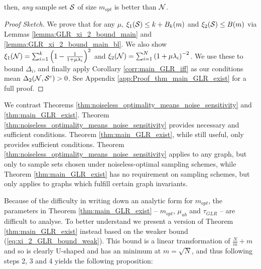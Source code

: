 {{\begin{theorem}
{    \noindent then,  \emph{any} sample set $\mathcal{S}$ of size $m_{opt}$ is better than $\mathcal{N}$.}
\end{theorem}
\begin{proof}[Proof Sketch] 
We prove that for any $\mu$, $\xi_{1}(\mathcal{S}) \leq k + B_{k}(m)$ and $\xi_{2}(\mathcal{S}) \leq B(m)$ via Lemmas \ref{lemma:GLR_xi_2_bound_main} and \ref{lemma:GLR_xi_2_bound_main_bl}. We also show $\xi_{1}(\mathcal{N}) = \sum_{i=1}^{k} \left(1 - \frac{1}{1+\mu\lambda_{i}}\right)^{2}$ and $\xi_{2}(\mathcal{N}) = \sum_{i=1}^{N} \left({1+\mu\lambda_{i}}\right)^{-2}$.
We use these to bound $\Delta_{i}$, and finally apply Corollary \ref{corr:main_GLR_iff} as our conditions mean $\Delta_{2}(\mathcal{N},\mathcal{S}^{c}) > 0$.  See Appendix \ref{app:Proof_thm_main_GLR_exist} for a full proof.
\end{proof}
}
 We contrast Theorems \ref{thm:noiseless_optimality_means_noise_sensitivity} and \ref{thm:main_GLR_exist}. Theorem \ref{thm:noiseless_optimality_means_noise_sensitivity} provides necessary and sufficient conditions. Theorem  \ref{thm:main_GLR_exist}, while still useful, only provides sufficient conditions. 
 Theorem \ref{thm:noiseless_optimality_means_noise_sensitivity} applies to any graph, but only to sample sets chosen under noiseless-optimal sampling schemes, while Theorem \ref{thm:main_GLR_exist} has no requirement on sampling schemes, but only applies to graphs which fulfill certain graph invariants. %

{\color{black}
Because of the difficulty in writing down an analytic form for $m_{opt}$, the parameters in Theorem \ref{thm:main_GLR_exist} -- $m_{opt}$, $\mu_{ub}$ and $\tau_{GLR}$ -- are difficult to analyse. To better understand  we present a version of Theorem \ref{thm:main_GLR_exist} instead based on  
the weaker bound (\ref{eq:xi_2_GLR_bound_weak}). This bound is a linear transformation of $\frac{N}{m} + m$ and so is clearly U-shaped and has an minimum at $m=\sqrt{N}$, and thus following steps 2, 3 and 4 yields the following proposition:

}}
